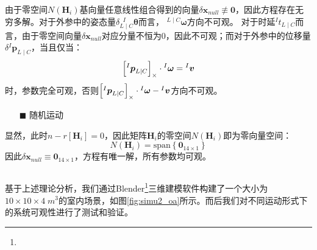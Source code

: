 由于零空间$N(\boldsymbol{H}_i)$基向量任意线性组合得到的向量$\delta\boldsymbol{x}_{null}\not\equiv\boldsymbol{0}$，因此方程存在无穷多解。对于外参中的姿态量$\delta {^{\;\;I}_{L\mid C}\boldsymbol{\theta}}$而言，
${^{L\mid C}\boldsymbol{\omega}}$方向不可观。
对于时延${^{I}t_{L\mid C}}$而言，由于零空间向量$\delta\boldsymbol{x}_{null}$对应分量不恒为0，因此不可观；而对于外参中的位移量$\delta {^{I}\boldsymbol{p}_{L\mid C}}$，当且仅当：
\begin{equation}
  \left[ {^{I}\boldsymbol{p}_{L\mid C}} \right]_\times\cdot{^{I}\boldsymbol{\omega}}={^{I}\boldsymbol{v}}
\end{equation}
时，参数完全可观，否则$\left[ {^{I}\boldsymbol{p}_{L\mid C}} \right]_\times\cdot{^{I}\boldsymbol{\omega}}-{^{I}\boldsymbol{v}}$方向不可观。

\begin{itemize}
  \item[$\blacksquare$]随机运动
\end{itemize}

显然，此时$n-r\left[ \boldsymbol{H}_i\right] =0$，因此矩阵$\boldsymbol{H}_i$的零空间$N(\boldsymbol{H}_i)$即为零向量空间：
\begin{equation}
  N(\boldsymbol{H}_i)=\mathrm{span}\left\lbrace
  \boldsymbol{0}_{14\times 1}
  \right\rbrace
\end{equation}
因此$\delta\boldsymbol{x}_{null}\equiv\boldsymbol{0}_{14\times 1}$，方程有唯一解，所有参数均可观。

\subsection{}
基于上述理论分析，我们通过Blender\footnote{}三维建模软件构建了一个大小为$10\times 10\times 4\; m^3$的室内场景，如图\ref{fig:simu2_oa}所示。而后我们对不同运动形式下的系统可观性进行了测试和验证。

